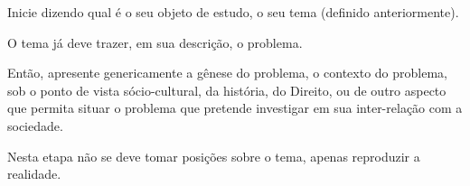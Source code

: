 Inicie dizendo qual é o seu objeto de estudo, o seu tema (definido anteriormente).

O tema já deve trazer, em sua descrição, o problema.

Então, apresente genericamente a gênese do problema, o contexto do problema, sob o ponto de vista sócio-cultural, da história, do Direito, ou de outro aspecto que permita situar o problema que pretende investigar em sua inter-relação com a sociedade.

Nesta etapa não se deve tomar posições sobre o tema, apenas reproduzir a realidade.

